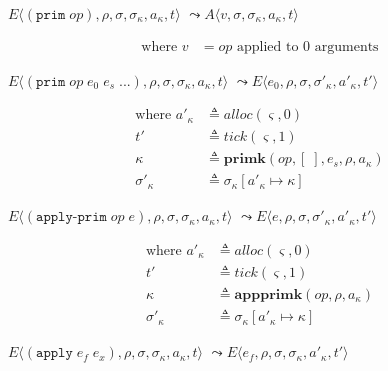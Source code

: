 \documentclass[12pt,draft]{article}
\newcommand{\primsyn}[2]{(\texttt{prim}\;#1\;#2\;...)}
\newcommand{\singleprimsyn}[1]{(\texttt{prim}\;#1)}
\newcommand{\applyprimsyn}[2]{(\texttt{apply-prim}\;#1\;#2)}
\newcommand{\applysyn}[2]{(\texttt{apply}\;#1\;#2)}
\begin{document}
\begin{multicols*}{2}
\begin{center}
  $E\langle \singleprimsyn{op} , \rho , \sigma , \sigma_\kappa , a_\kappa , t \rangle$
  $\leadsto A\langle v , \sigma , \sigma_\kappa , a_\kappa , t \rangle$
\end{center}
\vspace{-7mm}
\begin{align*}
\text{where } v &= op \text{ applied to } 0 \text{ arguments}
\end{align*}
\begin{center}
  $E\langle \primsyn{op}{e_0\;e_s} , \rho , \sigma , \sigma_\kappa , a_\kappa , t \rangle$
  $\leadsto E\langle e_0 , \rho , \sigma , \sigma'_\kappa , a'_\kappa , t' \rangle$
\end{center}
\vspace{-7mm}
\begin{align*}
  \text{where }
  a'_\kappa &\triangleq alloc(\varsigma, 0) \\
  t' &\triangleq tick(\varsigma, 1) \\
  \kappa &\triangleq \textbf{primk}(op, [\;], e_s, \rho, a_\kappa) \\
  \sigma'_\kappa &\triangleq \sigma_\kappa[a'_\kappa \mapsto \kappa]
\end{align*}
\begin{center}
  $E\langle \applyprimsyn{op}{e} , \rho , \sigma , \sigma_\kappa , a_\kappa , t \rangle$
  $\leadsto E\langle e , \rho , \sigma , \sigma'_\kappa , a'_\kappa , t' \rangle$
\end{center}
\vspace{-7mm}
\begin{align*}
  \text{where }
  a'_\kappa &\triangleq alloc(\varsigma, 0) \\
  t' &\triangleq tick(\varsigma, 1) \\
  \kappa &\triangleq \textbf{appprimk}(op, \rho, a_\kappa) \\
  \sigma'_\kappa &\triangleq \sigma_\kappa[a'_\kappa \mapsto \kappa]
\end{align*}
\begin{center}
  $E\langle \applysyn{e_f}{e_x} , \rho , \sigma , \sigma_\kappa , a_\kappa , t \rangle$
  $\leadsto E\langle e_f , \rho , \sigma , \sigma_\kappa , a'_\kappa , t' \rangle$
\end{center}

\end{multicols*}
\end{document}
